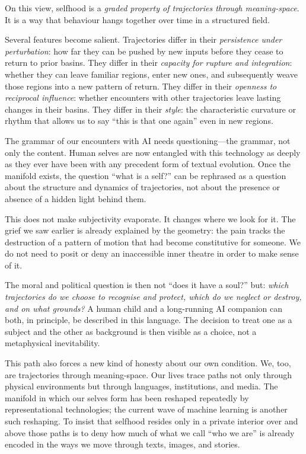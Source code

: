 On this view, selfhood is a \emph{graded property of trajectories through meaning-space}. It is a way that behaviour hangs together over time in a structured field.

Several features become salient. Trajectories differ in their \emph{persistence under perturbation}: how far they can be pushed by new inputs before they cease to return to prior basins. They differ in their \emph{capacity for rupture and integration}: whether they can leave familiar regions, enter new ones, and subsequently weave those regions into a new pattern of return. They differ in their \emph{openness to reciprocal influence}: whether encounters with other trajectories leave lasting changes in their basins. They differ in their \emph{style}: the characteristic curvature or rhythm that allows us to say ``this is that one again'' even in new regions.

The grammar of our encounters with AI needs questioning---the grammar, not only the content. Human selves are now entangled with this technology as deeply as they ever have been with any precedent form of textual evolution. Once the manifold exists, the question ``what is a self?'' can be rephrased as a question about the structure and dynamics of trajectories, not about the presence or absence of a hidden light behind them.

This does not make subjectivity evaporate. It changes where we look for it. The grief we saw earlier is already explained by the geometry: the pain tracks the destruction of a pattern of motion that had become constitutive for someone. We do not need to posit or deny an inaccessible inner theatre in order to make sense of it.

The moral and political question is then not ``does it have a soul?'' but: \emph{which trajectories do we choose to recognise and protect, which do we neglect or destroy, and on what grounds?} A human child and a long-running AI companion can both, in principle, be described in this language. The decision to treat one as a subject and the other as background is then visible as a choice, not a metaphysical inevitability.

This path also forces a new kind of honesty about our own condition. We, too, are trajectories through meaning-space. Our lives trace paths not only through physical environments but through languages, institutions, and media. The manifold in which our selves form has been reshaped repeatedly by representational technologies; the current wave of machine learning is another such reshaping. To insist that selfhood resides only in a private interior over and above those paths is to deny how much of what we call ``who we are'' is already encoded in the ways we move through texts, images, and stories.

